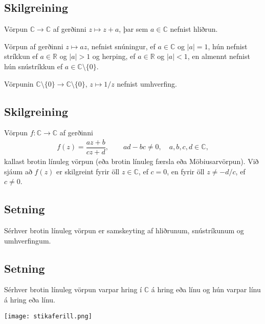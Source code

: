 \documentclass[a4paper,10pt,icelandic]{sphinxmanual}
\begin{document}
\subsection{Skilgreining}
\label{\detokenize{Kafli01:id15}}
Vörpun \({\mathbb{C}}\to {\mathbb{C}}\) af gerðinni
\(z\mapsto z+a\), þar sem \(a\in {\mathbb{C}}\) nefnist hliðrun.

Vörpun af gerðinni \(z\mapsto az\), nefnist snúningur, ef
\(a\in {\mathbb{C}}\) og \(|a|=1\), hún nefnist stríkkun ef \(a\in
\mathbb{R}\) og \(|a|>1\) og herping, ef \(a\in \mathbb{R}\) og \(|a|<1\), en
almennt nefnist hún snústríkkun ef \(a\in {\mathbb{C}}\setminus \{0\}\).

Vörpunin \({\mathbb{C}}\setminus \{0\} \to {\mathbb{C}}\setminus \{0\}\),
\(z\mapsto 1/z\) nefnist umhverfing.


\subsection{Skilgreining}
\label{\detokenize{Kafli01:id16}}
Vörpun \(f:{\mathbb{C}}\rightarrow{\mathbb{C}}\) af gerðinni
\begin{equation*}
\begin{split}f(z)=\dfrac{az+b}{cz+d}, \qquad ad-bc\neq 0, \quad a,b,c,d\in {\mathbb{C}},\end{split}
\end{equation*}
kallast brotin línuleg vörpun (eða brotin línuleg færsla eða
Möbiusarvörpun). Við sjáum að \(f(z)\) er skilgreint fyrir öll
\(z\in {\mathbb{C}}\), ef \(c=0\), en fyrir öll \(z\neq -d/c\), ef
\(c\neq 0\).


\subsection{Setning}
\label{\detokenize{Kafli01:id17}}
Sérhver brotin línuleg vörpun er samskeyting af hliðrunum,
snústríkunum og umhverfingum.


\subsection{Setning}
\label{\detokenize{Kafli01:id18}}
Sérhver brotin línuleg vörpun varpar hring í \({\mathbb{C}}\) á
hring eða línu og hún varpar línu á hring eða línu.


\begin{center}
\texttt{[image: stikaferill.png]}
\end{center}
\end{document}
